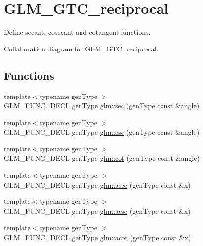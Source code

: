 \hypertarget{group__gtc__reciprocal}{\section{G\-L\-M\-\_\-\-G\-T\-C\-\_\-reciprocal}
\label{group__gtc__reciprocal}
}


Define secant, cosecant and cotangent functions.  


Collaboration diagram for G\-L\-M\-\_\-\-G\-T\-C\-\_\-reciprocal\-:
\subsection*{Functions}
\begin{DoxyCompactItemize}
\item 
{\footnotesize template$<$typename gen\-Type $>$ }\\G\-L\-M\-\_\-\-F\-U\-N\-C\-\_\-\-D\-E\-C\-L gen\-Type \hyperlink{group__gtc__reciprocal_gabb6829a472da1cc94d88afa6396bed1f}{glm\-::sec} (gen\-Type const \&angle)
\item 
{\footnotesize template$<$typename gen\-Type $>$ }\\G\-L\-M\-\_\-\-F\-U\-N\-C\-\_\-\-D\-E\-C\-L gen\-Type \hyperlink{group__gtc__reciprocal_ga5df75de99f63e854087a06f538907b2c}{glm\-::csc} (gen\-Type const \&angle)
\item 
{\footnotesize template$<$typename gen\-Type $>$ }\\G\-L\-M\-\_\-\-F\-U\-N\-C\-\_\-\-D\-E\-C\-L gen\-Type \hyperlink{group__gtc__reciprocal_ga2f49e28c2634ae1a212e2fc38c42ad42}{glm\-::cot} (gen\-Type const \&angle)
\item 
{\footnotesize template$<$typename gen\-Type $>$ }\\G\-L\-M\-\_\-\-F\-U\-N\-C\-\_\-\-D\-E\-C\-L gen\-Type \hyperlink{group__gtc__reciprocal_gac9761980e09149002a466ca131a4bcac}{glm\-::asec} (gen\-Type const \&x)
\item 
{\footnotesize template$<$typename gen\-Type $>$ }\\G\-L\-M\-\_\-\-F\-U\-N\-C\-\_\-\-D\-E\-C\-L gen\-Type \hyperlink{group__gtc__reciprocal_ga135e8f6b36bb85b5f7d8067e6b890e4d}{glm\-::acsc} (gen\-Type const \&x)
\item 
{\footnotesize template$<$typename gen\-Type $>$ }\\G\-L\-M\-\_\-\-F\-U\-N\-C\-\_\-\-D\-E\-C\-L gen\-Type \hyperlink{group__gtc__reciprocal_ga97d029f989f849b62915b068c264246b}{glm\-::acot} (gen\-Type const \&x)

\end{DoxyCompactItemize}
